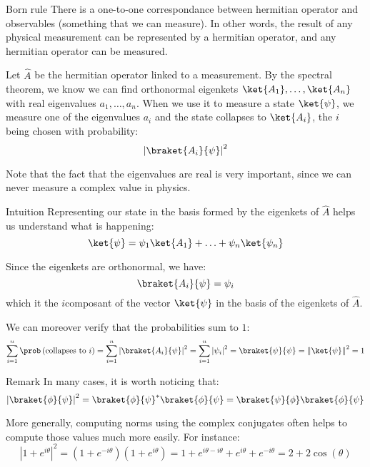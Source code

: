 \documentclass[a4paper]{article}
\begin{document}
\begin{parag}{Born rule}
    There is a one-to-one correspondance between hermitian operator and observables (something that we can measure). In other words, the result of any physical measurement can be represented by a hermitian operator, and any hermitian operator can be measured.

    Let $\hat{A}$ be the hermitian operator linked to a measurement. By the spectral theorem, we know we can find orthonormal eigenkets $\ket{A_1}, \ldots, \ket{A_n}$ with real eigenvalues $a_1, \ldots, a_n$. When we use it to measure a state $\ket{\psi}$, we measure one of the eigenvalues $a_i$ and the state collapses to $\ket{A_i}$, the $i$ being chosen with probability: 
    \[\left|\braket{A_i}{\psi}\right|^2\]

    Note that the fact that the eigenvalues are real is very important, since we can never measure a complex value in physics.

    \begin{subparag}{Intuition}
        Representing our state in the basis formed by the eigenkets of $\hat{A}$ helps us understand what is happening: 
        \[\ket{\psi} = \psi_1 \ket{A_1} + \ldots + \psi_n \ket{\psi_n}\]
        
        Since the eigenkets are orthonormal, we have: 
        \[\braket{A_i}{\psi} = \psi_i\]
        which it the $i$\Th composant of the vector $\ket{\psi}$ in the basis of the eigenkets of $\hat{A}$.

        We can moreover verify that the probabilities sum to $1$:
        \[\sum_{i=1}^{n} \prob\left(\text{collapses to $i$}\right) = \sum_{i=1}^{n}\left|\braket{A_i}{\psi}\right|^2 = \sum_{i=1}^{n}\left|\psi_i\right|^2 = \braket{\psi}{\psi} = \left\|\ket{\psi}\right\|^2 = 1\]
    \end{subparag}

    \begin{subparag}{Remark}
        In many cases, it is worth noticing that: 
        \[\left|\braket{\phi}{\psi}\right|^2 = \braket{\phi}{\psi}^* \braket{\phi}{\psi} = \braket{\psi}{\phi}\braket{\phi}{\psi}\]
        
        More generally, computing norms using the complex conjugates often helps to compute those values much more easily. For instance: 
        \[\left|1 + e^{i\theta}\right|^2 = \left(1 + e^{-i\theta}\right)\left(1 + e^{i\theta}\right) = 1 + e^{i\theta - i\theta} + e^{i\theta} + e^{-i\theta} = 2 + 2\cos\left(\theta\right)\]
    \end{subparag}
\end{parag}
\end{document}
